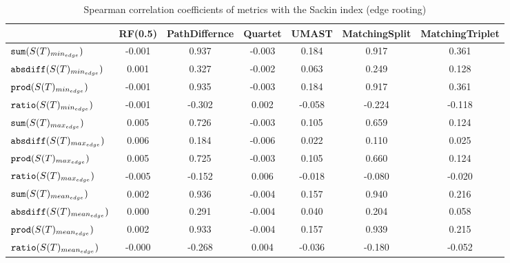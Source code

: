\begin{table}[h]
\centering
\caption{Spearman correlation coefficients of metrics with the Sackin index (edge rooting)}
\begin{tabular}{lcccccc}
 & RF(0.5) & PathDiffernce & Quartet & UMAST & MatchingSplit & MatchingTriplet \\
\hline
${\verb+sum+}(S(T)_{min_{edge}})$ & -0.001 & 0.937 & -0.003 & 0.184 & 0.917 & 0.361 \\
${\verb+absdiff+}(S(T)_{min_{edge}})$ & 0.001 & 0.327 & -0.002 & 0.063 & 0.249 & 0.128 \\
${\verb+prod+}(S(T)_{min_{edge}})$ & -0.001 & 0.935 & -0.003 & 0.184 & 0.917 & 0.361 \\
${\verb+ratio+}(S(T)_{min_{edge}})$ & -0.001 & -0.302 & 0.002 & -0.058 & -0.224 & -0.118 \\
${\verb+sum+}(S(T)_{max_{edge}})$ & 0.005 & 0.726 & -0.003 & 0.105 & 0.659 & 0.124 \\
${\verb+absdiff+}(S(T)_{max_{edge}})$ & 0.006 & 0.184 & -0.006 & 0.022 & 0.110 & 0.025 \\
${\verb+prod+}(S(T)_{max_{edge}})$ & 0.005 & 0.725 & -0.003 & 0.105 & 0.660 & 0.124 \\
${\verb+ratio+}(S(T)_{max_{edge}})$ & -0.005 & -0.152 & 0.006 & -0.018 & -0.080 & -0.020 \\
${\verb+sum+}(S(T)_{mean_{edge}})$ & 0.002 & 0.936 & -0.004 & 0.157 & 0.940 & 0.216 \\
${\verb+absdiff+}(S(T)_{mean_{edge}})$ & 0.000 & 0.291 & -0.004 & 0.040 & 0.204 & 0.058 \\
${\verb+prod+}(S(T)_{mean_{edge}})$ & 0.002 & 0.933 & -0.004 & 0.157 & 0.939 & 0.215 \\
${\verb+ratio+}(S(T)_{mean_{edge}})$ & -0.000 & -0.268 & 0.004 & -0.036 & -0.180 & -0.052 \\
\end{tabular}
\end{table}

